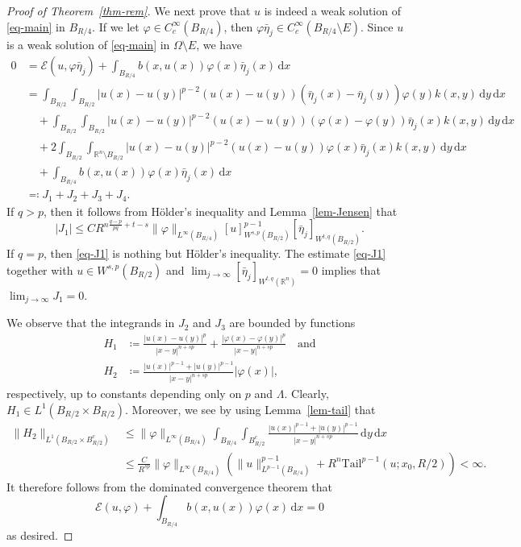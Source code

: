 \documentclass[11pt]{amsart}
\theoremstyle{plain}
\theoremstyle{definition}
\numberwithin{equation}{section}
\begin{document}
\begin{proof}[Proof of Theorem~\ref{thm-rem}]
We next prove that $u$ is indeed a weak solution of \eqref{eq-main} in $B_{R/4}$. If we let $\varphi \in C^\infty_c(B_{R/4})$, then $\varphi \bar{\eta}_j \in C^\infty_c(B_{R/4} \setminus E)$. Since $u$ is a weak solution of \eqref{eq-main} in $\Omega \setminus E$, we have
\begin{align*}
0
&=\mathcal{E}(u, \varphi\bar{\eta}_j) + \int_{B_{R/4}} b(x, u(x))\varphi(x)\bar{\eta}_j(x)\,\mathrm{d}x \\
&= \int_{B_{R/2}} \int_{B_{R/2}} |u(x)-u(y)|^{p-2}(u(x)-u(y))(\bar{\eta}_j(x)-\bar{\eta}_j(y))\varphi(y) k(x, y) \,\mathrm{d}y\,\mathrm{d}x \\
&\quad + \int_{B_{R/2}} \int_{B_{R/2}} |u(x)-u(y)|^{p-2}(u(x)-u(y))(\varphi(x)-\varphi(y))\bar{\eta}_j(x) k(x, y) \,\mathrm{d}y\,\mathrm{d}x \\
&\quad + 2\int_{B_{R/2}} \int_{\mathbb{R}^n \setminus B_{R/2}} |u(x)-u(y)|^{p-2}(u(x)-u(y)) \varphi(x)\bar{\eta}_j(x) k(x, y) \,\mathrm{d}y\,\mathrm{d}x \\
&\quad + \int_{B_{R/4}} b(x, u(x))\varphi(x)\bar{\eta}_j(x)\,\mathrm{d}x \\
&\eqqcolon J_1 + J_2 + J_3 + J_4.
\end{align*}
If $q>p$, then it follows from H\"older's inequality and Lemma~\ref{lem-Jensen} that
\begin{equation}\label{eq-J1}
|J_1| \leq CR^{n\frac{q-p}{pq}+t-s} \|\varphi\|_{L^\infty(B_{R/4})} [u]_{W^{s, p}(B_{R/2})}^{p-1} [\bar{\eta}_j]_{W^{t, q}(B_{R/2})}.
\end{equation}
If $q=p$, then \eqref{eq-J1} is nothing but H\"older's inequality. The estimate \eqref{eq-J1} together with $u \in W^{s ,p}(B_{R/2})$ and $\lim_{j\to\infty} [\bar{\eta}_j]_{W^{t, q}(\mathbb{R}^n)} = 0$ implies that $\lim_{j \to \infty} J_1=0$.

We observe that the integrands in $J_2$ and $J_3$ are bounded by functions
\begin{align*}
H_1 &\coloneqq \frac{|u(x)-u(y)|^p}{|x-y|^{n+sp}} + \frac{|\varphi(x)-\varphi(y)|^p}{|x-y|^{n+sp}} \quad\text{and} \\
H_2 &\coloneqq \frac{|u(x)|^{p-1} + |u(y)|^{p-1}}{|x-y|^{n+sp}} |\varphi(x)|,
\end{align*}
respectively, up to constants depending only on $p$ and $\Lambda$. Clearly, $H_1 \in L^1(B_{R/2} \times B_{R/2})$. Moreover, we see by using Lemma~\ref{lem-tail} that
\begin{align*}
\|H_2\|_{L^1(B_{R/2} \times B_{R/2}^c)}
&\leq \|\varphi\|_{L^\infty(B_{R/4})} \int_{B_{R/4}} \int_{B_{R/2}^c} \frac{|u(x)|^{p-1}+|u(y)|^{p-1}}{|x-y|^{n+sp}}\,\mathrm{d}y\,\mathrm{d}x\\
&\leq \frac{C}{R^{sp}} \|\varphi\|_{L^\infty(B_{R/4})} \left( \|u\|_{L^{p-1}(B_{R/4})}^{p-1} + R^n \mathrm{Tail}^{p-1}(u; x_0, R/2) \right) < \infty.
\end{align*}
It therefore follows from the dominated convergence theorem that 
\begin{equation*}
    \mathcal{E}(u, \varphi)+\int_{B_{R/4}} b(x, u(x))\varphi(x)\,\mathrm{d}x=0
\end{equation*} 
as desired.
\end{proof}
\end{document}
